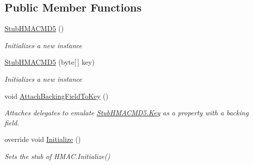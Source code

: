 \subsection*{Public Member Functions}
\begin{DoxyCompactItemize}
\item 
\hyperlink{class_system_1_1_security_1_1_cryptography_1_1_fakes_1_1_stub_h_m_a_c_m_d5_a7d3a516bd1d65407ad128d80865bc746}{Stub\-H\-M\-A\-C\-M\-D5} ()
\begin{DoxyCompactList}\small\item\em Initializes a new instance\end{DoxyCompactList}\item 
\hyperlink{class_system_1_1_security_1_1_cryptography_1_1_fakes_1_1_stub_h_m_a_c_m_d5_aeff47f67daa3d0bb8b574100091146d9}{Stub\-H\-M\-A\-C\-M\-D5} (byte\mbox{[}$\,$\mbox{]} key)
\begin{DoxyCompactList}\small\item\em Initializes a new instance\end{DoxyCompactList}\item 
void \hyperlink{class_system_1_1_security_1_1_cryptography_1_1_fakes_1_1_stub_h_m_a_c_m_d5_aed627e957d3d945d05ed2b21ee0c578d}{Attach\-Backing\-Field\-To\-Key} ()
\begin{DoxyCompactList}\small\item\em Attaches delegates to emulate \hyperlink{class_system_1_1_security_1_1_cryptography_1_1_fakes_1_1_stub_h_m_a_c_m_d5_a7dc2483e22665a1a942f0e424967b92e}{Stub\-H\-M\-A\-C\-M\-D5.\-Key} as a property with a backing field.\end{DoxyCompactList}\item 
override void \hyperlink{class_system_1_1_security_1_1_cryptography_1_1_fakes_1_1_stub_h_m_a_c_m_d5_ae96b58666e52e801de7baa7581e82e30}{Initialize} ()
\begin{DoxyCompactList}\small\item\em Sets the stub of H\-M\-A\-C.\-Initialize()\end{DoxyCompactList}\end{DoxyCompactItemize}
